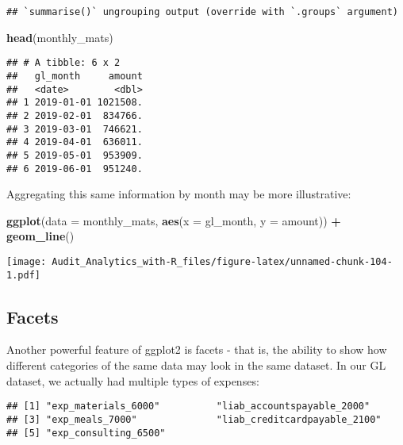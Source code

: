 \documentclass[
]{book}
\newenvironment{Shaded}{\begin{snugshade}}{\end{snugshade}}
\newcommand{\DataTypeTok}[1]{\textcolor[rgb]{0.13,0.29,0.53}{#1}}
\newcommand{\KeywordTok}[1]{\textcolor[rgb]{0.13,0.29,0.53}{\textbf{#1}}}
\newcommand{\NormalTok}[1]{#1}
\newcommand{\OperatorTok}[1]{\textcolor[rgb]{0.81,0.36,0.00}{\textbf{#1}}}
\newcommand{\StringTok}[1]{\textcolor[rgb]{0.31,0.60,0.02}{#1}}
\begin{document}
\begin{verbatim}
## `summarise()` ungrouping output (override with `.groups` argument)
\end{verbatim}

\begin{Shaded}
\begin{Highlighting}[]
\KeywordTok{head}\NormalTok{(monthly_mats)}
\end{Highlighting}
\end{Shaded}

\begin{verbatim}
## # A tibble: 6 x 2
##   gl_month     amount
##   <date>        <dbl>
## 1 2019-01-01 1021508.
## 2 2019-02-01  834766.
## 3 2019-03-01  746621.
## 4 2019-04-01  636011.
## 5 2019-05-01  953909.
## 6 2019-06-01  951240.
\end{verbatim}

Aggregating this same information by month may be more illustrative:

\begin{Shaded}
\begin{Highlighting}[]
\KeywordTok{ggplot}\NormalTok{(}\DataTypeTok{data =}\NormalTok{ monthly_mats, }\KeywordTok{aes}\NormalTok{(}\DataTypeTok{x =}\NormalTok{ gl_month, }\DataTypeTok{y =}\NormalTok{ amount)) }\OperatorTok{+}
\StringTok{  }\KeywordTok{geom_line}\NormalTok{()}
\end{Highlighting}
\end{Shaded}

\texttt{[image: Audit\_Analytics\_with-R\_files/figure-latex/unnamed-chunk-104-1.pdf]}

\hypertarget{facets}{%
\subsection{Facets}\label{facets}}

Another powerful feature of ggplot2 is facets - that is, the ability to show how different categories of the same data may look in the same dataset. In our GL dataset, we actually had multiple types of expenses:

\begin{Shaded}
\end{Shaded}

\begin{verbatim}
## [1] "exp_materials_6000"          "liab_accountspayable_2000"  
## [3] "exp_meals_7000"              "liab_creditcardpayable_2100"
## [5] "exp_consulting_6500"
\end{verbatim}
\end{document}

